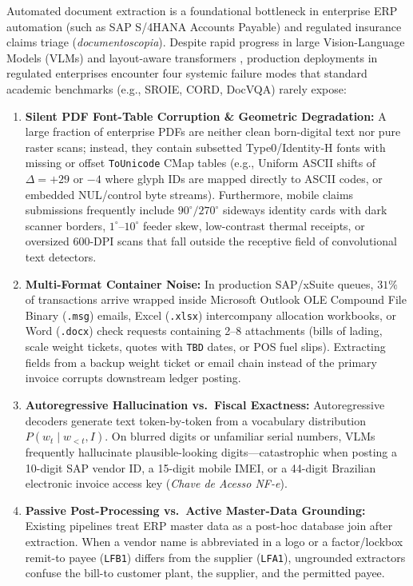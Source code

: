 \documentclass[10pt,twocolumn,letterpaper]{article}
\begin{document}
Automated document extraction is a foundational bottleneck in enterprise ERP automation (such as SAP S/4HANA Accounts Payable) and regulated insurance claims triage (\emph{documentoscopia}). Despite rapid progress in large Vision-Language Models (VLMs) \cite{qwen2vl2024,gpt4o2024} and layout-aware transformers \cite{huang2022layoutlmv3,kim2022donut}, production deployments in regulated enterprises encounter four systemic failure modes that standard academic benchmarks (e.g., SROIE, CORD, DocVQA) rarely expose:

\begin{enumerate}[leftmargin=1.4em,itemsep=2pt,topsep=3pt]
    \item \textbf{Silent PDF Font-Table Corruption \& Geometric Degradation:} A large fraction of enterprise PDFs are neither clean born-digital text nor pure raster scans; instead, they contain subsetted Type0/Identity-H fonts with missing or offset \texttt{ToUnicode} CMap tables (e.g., Uniform ASCII shifts of $\Delta = +29$ or $-4$ where glyph IDs are mapped directly to ASCII codes, or embedded NUL/control byte streams). Furthermore, mobile claims submissions frequently include $90^\circ/270^\circ$ sideways identity cards with dark scanner borders, $1^\circ\text{--}10^\circ$ feeder skew, low-contrast thermal receipts, or oversized 600-DPI scans that fall outside the receptive field of convolutional text detectors.
    \item \textbf{Multi-Format Container Noise:} In production SAP/xSuite queues, $31\%$ of transactions arrive wrapped inside Microsoft Outlook OLE Compound File Binary (\texttt{.msg}) emails, Excel (\texttt{.xlsx}) intercompany allocation workbooks, or Word (\texttt{.docx}) check requests containing 2--8 attachments (bills of lading, scale weight tickets, quotes with \texttt{TBD} dates, or POS fuel slips). Extracting fields from a backup weight ticket or email chain instead of the primary invoice corrupts downstream ledger posting.
    \item \textbf{Autoregressive Hallucination vs.\ Fiscal Exactness:} Autoregressive decoders generate text token-by-token from a vocabulary distribution $P(w_t \mid w_{<t}, I)$. On blurred digits or unfamiliar serial numbers, VLMs frequently hallucinate plausible-looking digits—catastrophic when posting a 10-digit SAP vendor ID, a 15-digit mobile IMEI, or a 44-digit Brazilian electronic invoice access key (\emph{Chave de Acesso NF-e}).
    \item \textbf{Passive Post-Processing vs.\ Active Master-Data Grounding:} Existing pipelines treat ERP master data as a post-hoc database join after extraction. When a vendor name is abbreviated in a logo or a factor/lockbox remit-to payee (\texttt{LFB1}) differs from the supplier (\texttt{LFA1}), ungrounded extractors confuse the bill-to customer plant, the supplier, and the permitted payee.
\end{enumerate}
\end{document}
